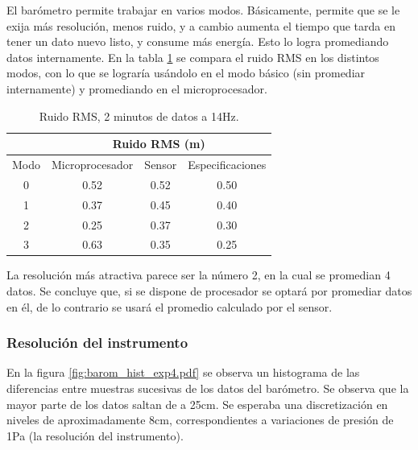 \documentclass[main]{subfiles}
\begin{document}
El barómetro permite trabajar en varios modos. Básicamente, permite que se le exija más resolución, menos ruido, y a cambio aumenta el tiempo que tarda en tener un dato nuevo listo, y consume más energía. Esto lo logra promediando datos internamente. En la tabla \ref{tab:ruido-rms} se compara el ruido RMS en los distintos modos, con lo que se lograría usándolo en el modo básico (sin promediar internamente) y promediando en el microprocesador.

\begin{table}[H]
\centering
\begin{tabular}{c|c|c|c|} 
\cline{2-4}
	& \multicolumn{3}{|c|}{\cellcolor[gray]{0.8} Ruido RMS  (m)}      \\ \hline
\multicolumn{1}{|c|}{\cellcolor[gray]{0.8} {Modo}} & \cellcolor[gray]{0.8} {Microprocesador} &\cellcolor[gray]{0.8} {Sensor} &\cellcolor[gray]{0.8} {Especificaciones}\\ \hline

\multicolumn{1}{|c|}{0}	&	0.52	&	0.52	&	0.50\\
\hline
\multicolumn{1}{|c|}{1}	&	0.37	&	0.45	&	0.40\\
\hline
\multicolumn{1}{|c|}{2}	&	0.25	&	0.37	&	0.30\\
\hline
\multicolumn{1}{|c|}{3}	&	0.63	&	0.35	&	0.25\\
\hline

\end{tabular}
\caption{Ruido RMS, 2 minutos de datos a 14Hz.}
\label{tab:ruido-rms}
\end{table}
\vspace{-15pt}
La resolución más atractiva parece ser la número 2, en la cual se promedian 4 datos. Se concluye que, si se dispone de procesador se optará por promediar datos en él, de lo contrario se usará el promedio calculado por el sensor.

\subsubsection{Resolución del instrumento}
En la figura \ref{fig:barom_hist_exp4.pdf} se observa un histograma de las diferencias entre muestras sucesivas de los datos del barómetro. Se observa que la mayor parte de los datos saltan de a 25cm. Se esperaba una discretización en niveles de  aproximadamente 8cm, correspondientes a variaciones de presión de 1Pa (la resolución del instrumento).
\end{document}
